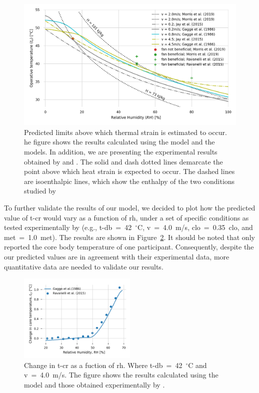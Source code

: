 \begin{figure}[thb!]
    \centering
    \includegraphics[width=\textwidth]{figures/comparison_air_speed.png}
    \caption{Predicted limits above which thermal strain is estimated to occur.
    he figure shows the results calculated using the  model and the  models.
    In addition, we are presenting the experimental results obtained by  and .
    The solid and dash dotted lines demarcate the point above which heat strain is expected to occur.
    The dashed lines are isoenthalpic lines, which show the enthalpy of the two conditions studied by }
    \label{fig:comparison_air_speed}
\end{figure}

To further validate the results of our model, we decided to plot how the predicted value of \ac{t-cr} would vary as a function of \ac{rh}, under a set of specific conditions as tested experimentally by  (e.g., \ac{t-db}~=~42~$^{\circ}$C, \ac{v}~=~4.0~m/s, \ac{clo}~=~0.35~clo, and \ac{met}~=~1.0~met).
The results are shown in Figure~\ref{fig:comparison_ravanelli}.
It should be noted that  only reported the core body temperature of one participant.
Consequently, despite the our predicted values are in agreement with their experimental data, more quantitative data are needed to validate our results.

\begin{figure}[thb!]
    \centering
    \includegraphics[width=0.5\textwidth]{figures/comparison_ravanelli}
    \caption{Change in \acf{t-cr} as a fuction of \acf{rh}.
    Where \ac{t-db}~=~42~$^{\circ}$C and \ac{v}~=~4.0~m/s.
    The figure shows the results calculated using the  model and those obtained experimentally by .}
    \label{fig:comparison_ravanelli}
\end{figure}

